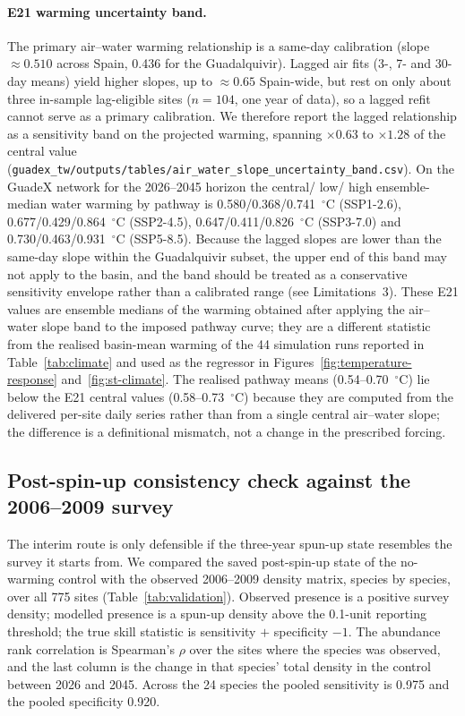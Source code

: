 \documentclass[11pt,a4paper]{article}
\begin{document}
\paragraph{E21 warming uncertainty band.} The primary air--water warming relationship is a same-day calibration (slope $\approx0.510$ across Spain, 0.436 for the Guadalquivir). Lagged air fits (3-, 7- and 30-day means) yield higher slopes, up to $\approx0.65$ Spain-wide, but rest on only about three in-sample lag-eligible sites ($n=104$, one year of data), so a lagged refit cannot serve as a primary calibration. We therefore report the lagged relationship as a sensitivity band on the projected warming, spanning $\times0.63$ to $\times1.28$ of the central value (\texttt{guadex\_tw/outputs/tables/air\_water\_slope\_uncertainty\_band.csv}). On the GuadeX network for the 2026--2045 horizon the central/ low/ high ensemble-median water warming by pathway is 0.580/0.368/0.741~$^\circ$C (SSP1-2.6), 0.677/0.429/0.864~$^\circ$C (SSP2-4.5), 0.647/0.411/0.826~$^\circ$C (SSP3-7.0) and 0.730/0.463/0.931~$^\circ$C (SSP5-8.5). Because the lagged slopes are lower than the same-day slope within the Guadalquivir subset, the upper end of this band may not apply to the basin, and the band should be treated as a conservative sensitivity envelope rather than a calibrated range (see Limitations~3). These E21 values are ensemble medians of the warming obtained after applying the air--water slope band to the imposed pathway curve; they are a different statistic from the realised basin-mean warming of the 44 simulation runs reported in Table~\ref{tab:climate} and used as the regressor in Figures~\ref{fig:temperature-response} and~\ref{fig:st-climate}. The realised pathway means (0.54--0.70~$^\circ$C) lie below the E21 central values (0.58--0.73~$^\circ$C) because they are computed from the delivered per-site daily series rather than from a single central air--water slope; the difference is a definitional mismatch, not a change in the prescribed forcing.

\subsection{Post-spin-up consistency check against the 2006--2009 survey}
\label{sec:validation}

The interim route is only defensible if the three-year spun-up state resembles the survey it starts
from. We compared the saved post-spin-up state of the no-warming control with the observed
2006--2009 density matrix, species by species, over all 775 sites (Table~\ref{tab:validation}).
Observed presence is a positive survey density; modelled presence is a spun-up density above the
0.1-unit reporting threshold; the true skill statistic is sensitivity $+$ specificity $-1$. The
abundance rank correlation is Spearman's $\rho$ over the sites where the species was observed, and
the last column is the change in that species' total density in the control between 2026 and 2045.
Across the 24 species the pooled sensitivity is 0.975 and the pooled specificity 0.920.
\end{document}

